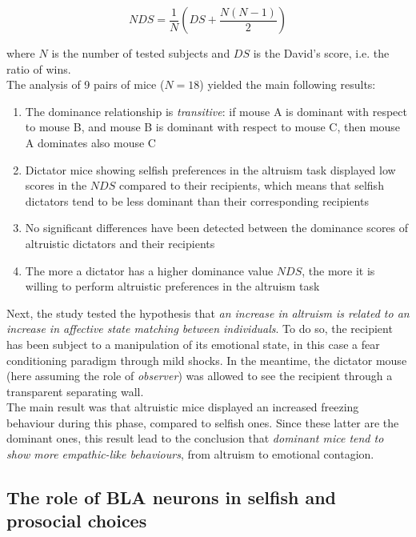 \documentclass[12pt, a4paper]{article}
\begin{document}
\begin{equation}
NDS = \frac{1}{N}\left(DS + \frac{N(N-1)}{2}\right)
\end{equation}

where $N$ is the number of tested subjects and $DS$ is the David's score, i.e. the ratio of wins.\\
The analysis of 9 pairs of mice ($N=18$) yielded the main following results:

\begin{enumerate}
	\item The dominance relationship is \textit{transitive}: if mouse A is dominant with respect to mouse B, and mouse B is dominant with respect to mouse C, then mouse A dominates also mouse C 
	
	\item Dictator mice showing selfish preferences in the altruism task displayed low scores in the $NDS$ compared to their recipients, which means that selfish dictators  tend to be less dominant than their corresponding recipients
	
	\item No significant differences have been detected between the dominance scores of altruistic dictators and their recipients
	
	\item The more a dictator has a higher dominance value $NDS$, the more it is willing to perform altruistic preferences in the altruism task
	
\end{enumerate}

Next, the study tested the hypothesis that \textit{an increase in altruism is related to an increase in affective state matching between individuals}. To do so, the recipient has been subject to a manipulation of its emotional state, in this case a fear conditioning paradigm through mild shocks. In the meantime, the dictator mouse (here assuming the role of \textit{observer}) was allowed to see the recipient through a transparent separating wall.\\
The main result was that altruistic mice displayed an increased freezing behaviour during this phase, compared to selfish ones. Since these latter are the dominant ones, this result lead to the conclusion that \textit{dominant mice tend to show more empathic-like behaviours}, from altruism to emotional contagion.

\subsection{The role of BLA neurons in selfish and prosocial choices}
\end{document}
